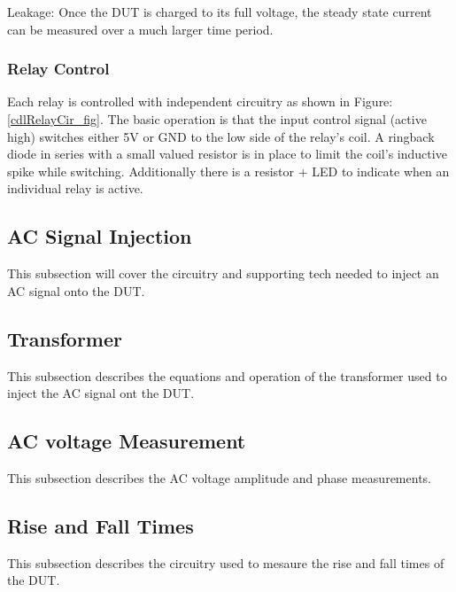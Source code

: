 Leakage:
Once the DUT is charged to its full voltage, the steady state current can be measured over a much larger time period.

\subsubsection{Relay Control}

Each relay is controlled with independent circuitry as shown in Figure: \ref{cdlRelayCir_fig}. The basic operation is that the input control signal (active high) switches either 5V or GND to the low side of the relay's coil. A ringback diode in series with a small valued resistor is in place to limit the coil's inductive spike while switching. Additionally there is a resistor + LED to indicate when an individual relay is active.

\subsection {AC Signal Injection}

This subsection will cover the circuitry and supporting tech needed to inject an AC signal onto the DUT.

\subsection {Transformer}

This subsection describes the equations and operation of the transformer used to inject the AC signal ont the DUT.

\subsection {AC voltage Measurement}

This subsection describes the AC voltage amplitude and phase measurements. 

\subsection {Rise and Fall Times}

This subsection describes the circuitry used to mesaure the rise and fall times of the DUT.

